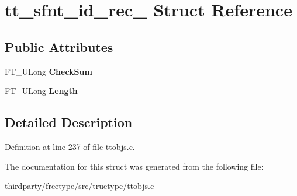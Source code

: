 \hypertarget{structtt__sfnt__id__rec__}{}\section{tt\+\_\+sfnt\+\_\+id\+\_\+rec\+\_\+ Struct Reference}
\label{structtt__sfnt__id__rec__}
\subsection*{Public Attributes}
\begin{DoxyCompactItemize}
\item 
\mbox{\label{structtt__sfnt__id__rec___aa877d3163cf93ea7c11a6c85fc6d1e16}} 
F\+T\+\_\+\+U\+Long {\bfseries Check\+Sum}
\item 
\mbox{\label{structtt__sfnt__id__rec___a6e0714ee8c759ef0b5039fea61c52a80}} 
F\+T\+\_\+\+U\+Long {\bfseries Length}
\end{DoxyCompactItemize}


\subsection{Detailed Description}


Definition at line 237 of file ttobjs.\+c.



The documentation for this struct was generated from the following file\+:\begin{DoxyCompactItemize}
\item 
thirdparty/freetype/src/truetype/ttobjs.\+c\end{DoxyCompactItemize}
